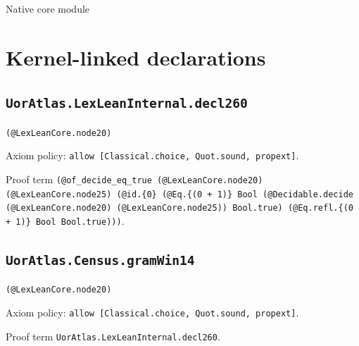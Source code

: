 \documentclass[11pt]{article}
\begin{document}
\begin{center}{\LARGE Native core module}\end{center}
\section*{Kernel-linked declarations}
\subsection*{\texttt{UorAtlas.LexLeanInternal.decl260}}
\noindent\texttt{(@LexLeanCore.node20)}\par
\noindent Axiom policy: \texttt{allow [Classical.choice, Quot.sound, propext]}.\par
\noindent Proof term \texttt{(@of\_decide\_eq\_true (@LexLeanCore.node20) (@LexLeanCore.node25) (@id.\{0\} (@Eq.\{(0 + 1)\} Bool (@Decidable.decide (@LexLeanCore.node20) (@LexLeanCore.node25)) Bool.true) (@Eq.refl.\{(0 + 1)\} Bool Bool.true)))}.\par
\subsection*{\texttt{UorAtlas.Census.gramWin14}}
\noindent\texttt{(@LexLeanCore.node20)}\par
\noindent Axiom policy: \texttt{allow [Classical.choice, Quot.sound, propext]}.\par
\noindent Proof term \texttt{UorAtlas.LexLeanInternal.decl260}.\par
\end{document}
